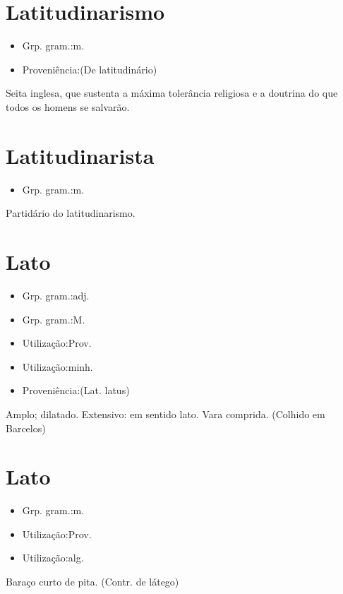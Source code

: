 \section{Latitudinarismo}
\begin{itemize}
\item {Grp. gram.:m.}
\end{itemize}
\begin{itemize}
\item {Proveniência:(De \textunderscore latitudinário\textunderscore )}
\end{itemize}
Seita inglesa, que sustenta a máxima tolerância religiosa e a doutrina do que todos os homens se salvarão.
\section{Latitudinarista}
\begin{itemize}
\item {Grp. gram.:m.}
\end{itemize}
Partidário do latitudinarismo.
\section{Lato}
\begin{itemize}
\item {Grp. gram.:adj.}
\end{itemize}
\begin{itemize}
\item {Grp. gram.:M.}
\end{itemize}
\begin{itemize}
\item {Utilização:Prov.}
\end{itemize}
\begin{itemize}
\item {Utilização:minh.}
\end{itemize}
\begin{itemize}
\item {Proveniência:(Lat. \textunderscore latus\textunderscore )}
\end{itemize}
Amplo; dilatado.
Extensivo: \textunderscore em sentido lato\textunderscore .
Vara comprida. (Colhido em Barcelos)
\section{Lato}
\begin{itemize}
\item {Grp. gram.:m.}
\end{itemize}
\begin{itemize}
\item {Utilização:Prov.}
\end{itemize}
\begin{itemize}
\item {Utilização:alg.}
\end{itemize}
Baraço curto de pita.
(Contr. de \textunderscore látego\textunderscore )
